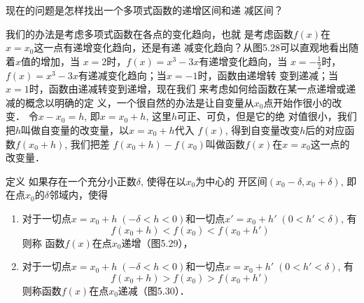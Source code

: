 现在的问题是怎样找出一个多项式函数的递增区间和递
减区间？

我们的办法是考虑多项式函数在各点的变化趋向，也就
是考虑函数$f(x)$在$x=x_0$这一点有递增变化趋向，还是有递
减变化趋向？从图5.28可以直观地看出随着$x$值的增加，当
$x=2$时，$f(x)=x^3-3x$有递增变化趋向，当
$x=-\frac{1}{2}$时，
$f(x)=x^3-3x$有递减变化趋向；当$x=-1$时，函数由递增转
变到递减；当$x=1$时，函数由递减转变到递增，现在我们
来考虑如何给函数在某一点递增或递减的概念以明确的定
义，一个很自然的办法是让自变量从$x_0$点开始作很小的改变．
令$x-x_0=h$, 即$x=x_0+h$, 这里$h$可正、可负，但是它的绝
对值很小，我们把$h$叫做自变量的改变量，以$x=x_0+h$代入
$f(x)$, 得到自变量改变$h$后的对应函数$f(x_0+h)$, 我们把差
$f(x_0+h)-f(x_0)$叫做函数$f(x)$在$x=x_0$这一点的改变量．


\begin{blk}{定义}
    如果存在一个充分小正数$\delta $, 使得在以$x_0$为中心的
开区间$(x_0-\delta,x_0+\delta)$, 即在点$x_0$的$\delta$邻域内，使得
\begin{enumerate}
    \item 对于一切点$x=x_0+h\; (-\delta<h<0)$和一切点$x'=
x_0+h'\; (0<h'<\delta)$, 有$$f(x_0+h)<f(x_0)<f(x_0+h')$$ 则称
函数$f(x)$在点$x_0$递增（图5.29），
\item 对于一切点$x=x_0+h\; (-\delta<h<0)$和一切点$x=x_0+
h'\; (0<h'<\delta)$, 有
$$f(x_0+h)>f(x_0)>f(x_0+h')$$
则称函数$f(x)$在点$x_0$递减（图5.30）．
\end{enumerate}
\end{blk}

